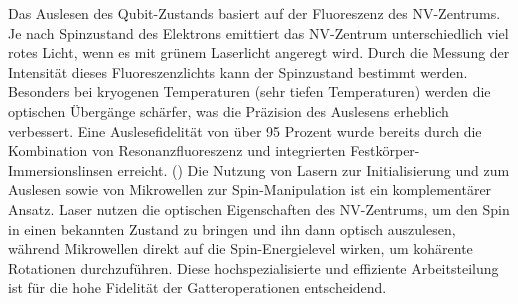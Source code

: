 Das Auslesen des Qubit-Zustands basiert auf der Fluoreszenz des NV-Zentrums. Je nach Spinzustand des Elektrons emittiert das NV-Zentrum unterschiedlich viel rotes Licht, wenn es mit grünem Laserlicht angeregt wird. Durch die Messung der Intensität dieses Fluoreszenzlichts kann der Spinzustand bestimmt werden. Besonders bei kryogenen Temperaturen (sehr tiefen Temperaturen) werden die optischen Übergänge schärfer, was die Präzision des Auslesens erheblich verbessert. Eine Auslesefidelität von über 95 Prozent wurde bereits durch die Kombination von Resonanzfluoreszenz und integrierten Festkörper-Immersionslinsen erreicht. (\cite{childressDiamondNVCenters2013}) Die Nutzung von Lasern zur Initialisierung und zum Auslesen sowie von Mikrowellen zur Spin-Manipulation ist ein komplementärer Ansatz. Laser nutzen die optischen Eigenschaften des NV-Zentrums, um den Spin in einen bekannten Zustand zu bringen und ihn dann optisch auszulesen, während Mikrowellen direkt auf die Spin-Energielevel wirken, um kohärente Rotationen durchzuführen. Diese hochspezialisierte und effiziente Arbeitsteilung ist für die hohe Fidelität der Gatteroperationen entscheidend.
